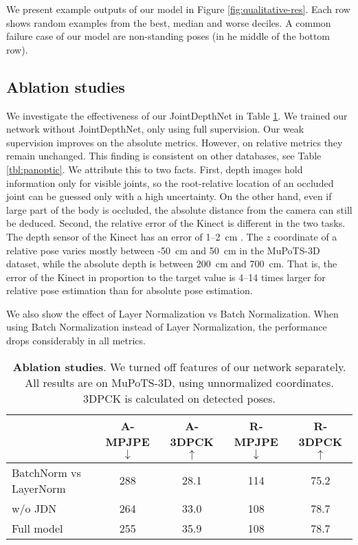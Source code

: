 \documentclass[runningheads]{llncs}
\begin{document}
We present example outputs of our model in Figure \ref{fig:qualitative-res}. Each row shows random examples from the best, median and worse deciles. A common failure case of our model are non-standing poses (in he middle of the bottom row).

\subsection{Ablation studies}
We investigate the effectiveness of our JointDepthNet in Table \ref{tbl:ablation}. We trained our network without JointDepthNet, only using full supervision. Our weak supervision improves on the absolute metrics. However, on relative metrics they remain unchanged. This finding is consistent on other databases, see Table \ref{tbl:panoptic}. We attribute this to two facts. First, depth images hold information only for visible joints, so the root-relative location of an occluded joint can be guessed only with a high uncertainty. On the other hand, even if large part of the body is occluded, the absolute distance from the camera can still be deduced. Second, the relative error of the Kinect is different in the two tasks. The depth sensor of the Kinect has an error of 1--2~cm \cite{wasenmuller2017kinecterror}. The $z$ coordinate of a relative pose varies mostly between -50~cm and 50~cm in the MuPoTS-3D dataset, while the absolute depth is between 200~cm and 700~cm. That is, the error of the Kinect in proportion to the target value is 4--14 times larger for relative pose estimation than for absolute pose estimation.

We also show the effect of Layer Normalization vs Batch Normalization. When using Batch Normalization instead of Layer Normalization, the performance drops considerably in all metrics.

\begin{table}[h]
\caption{\textbf{Ablation studies}. We turned off features of our network separately. All results are on MuPoTS-3D, using unnormalized coordinates. 3DPCK is calculated on detected poses. }
\label{tbl:ablation}
\begin{center}
\begin{tabular}{lcccc}

& A-MPJPE $\downarrow$ & A-3DPCK $\uparrow$ & R-MPJPE $\downarrow$ & R-3DPCK $\uparrow$   \\
\hline
BatchNorm vs LayerNorm & 288 & 28.1 & 114 & 75.2  \\  
w/o JDN & 264 & 33.0 & 108 & 78.7 \\ 
\hline

Full model & 255 & 35.9 & 108 & 78.7 \\ 
\end{tabular}
\end{center}
\end{table}
\end{document}
